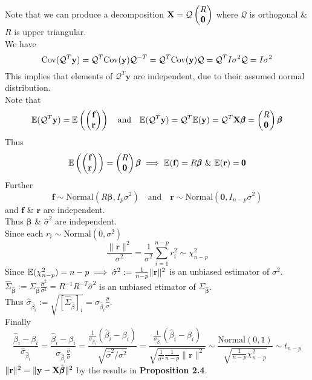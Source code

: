 \documentclass[11pt,a4paper]{article}
\begin{document}
Note that we can produce a decomposition $\textbf{X}=\mathcal{Q}\begin{pmatrix}R\\\pmb0\end{pmatrix}$ where $\mathcal{Q}$ is orthogonal \& $R$ is upper triangular.\\
We have
$$\mathrm{Cov}(\mathcal{Q}^T\textbf{y})=\mathcal{Q}^T\mathrm{Cov}(\textbf{y})\mathcal{Q}^{-T}=\mathcal{Q}^T\mathrm{Cov}(\textbf{y})\mathcal{Q}=\mathcal{Q}^TI\sigma^2\mathcal{Q}=I\sigma^2$$
This implies that elements of $\mathcal{Q}^T\textbf{y}$ are independent, due to their assumed normal distribution.\\
Note that
$$\mathbb{E}(\mathcal{Q}^T\textbf{y})=\mathbb{E}\left(\begin{pmatrix}\textbf{f}\\\textbf{r}\end{pmatrix}\right)\quad\text{and}\quad\mathbb{E}(\mathcal{Q}^T\textbf{y})=\mathcal{Q}^T\mathbb{E}(\textbf{y})=\mathcal{Q}^T\textbf{X}\pmb\beta=\begin{pmatrix}R\\\pmb0\end{pmatrix}\pmb\beta$$
Thus
$$\expect\left(\begin{pmatrix}\textbf{f}\\\textbf{r}\end{pmatrix}\right)=\begin{pmatrix}R\\\pmb0\end{pmatrix}\pmb\beta\implies\expect(\textbf{f})=R\pmb\beta\ \&\ \expect(\textbf{r})=\pmb0$$
Further
$$\textbf{f}\sim\text{Normal}(R\pmb\beta,I_p\sigma^2)\quad\text{and}\quad\textbf{r}\sim\text{Normal}(\pmb0,I_{n-p}\sigma^2)$$
and $\textbf{f}$ \& $\textbf{r}$ are independent.\\
Thus $\hat{\pmb\beta}$ \& $\hat\sigma^2$ are independent.\\
Since each $r_i\sim\text{Normal}(0,\sigma^2)$
$$\frac{\|\textbf{r}\|^2}{\sigma^2}=\frac{1}{\sigma^2}\sum_{i=1}^{n-p}r_i^2\sim\chi^2_{n-p}$$
Since $\mathbb{E}(\chi^2_{n-p})=n-p\implies\hat\sigma^2:=\frac{1}{n-p}\|\textbf{r}\|^2$ is an unbiased estimator of $\sigma^2$.\\
$\hat\Sigma_{\hat{\pmb\beta}}:=\Sigma_{\hat{\pmb\beta}}\frac{\hat\sigma^2}{\sigma^2}=R^{-1}R^{-T}\hat\sigma^2$ is an unbiased etimator of $\Sigma_{\hat{\pmb\beta}}$.\\
Thus $\hat\sigma_{\hat\beta_i}:=\sqrt{[\hat\Sigma_{\hat\beta}]_i}=\sigma_{\hat\beta_i}\frac{\hat\sigma}\sigma$.\\
Finally
$$\dfrac{\hat\beta_i-\beta_i}{\hat\sigma_{\hat\beta_i}}=\dfrac{\hat\beta_i-\beta_i}{\sigma_{\hat\beta_i}\frac{\hat\sigma}{\sigma}}=\frac{\frac1{\sigma_{\hat\beta_i}}(\hat\beta_i-\beta_i)}{\sqrt{\hat\sigma^2/\sigma^2}}=\frac{\frac1{\sigma_{\hat\beta_i}}(\hat\beta_i-\beta_i)}{\sqrt{\frac1{\sigma^2}\frac1{n-p}\|\textbf{r}\|^2}}\sim\frac{\text{Normal}(0,1)}{\sqrt{\frac{1}{n-p}\chi^2_{n-p}}}\sim t_{n-p}$$
\nb $\|\textbf{r}\|^2=\|\textbf{y}-\textbf{X}\hat{\pmb\beta}\|^2$ by the results in \textbf{Proposition 2.4}.\\
\end{document}
